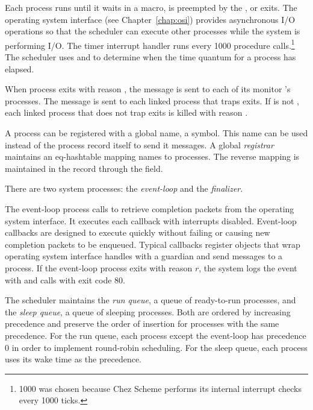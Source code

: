 Each process runs until it waits in a  macro, is
preempted by the , or exits.  The
operating system interface (see Chapter~\ref{chap:osi}) provides
asynchronous I/O operations so that the scheduler can execute other
processes while the system is performing I/O.  The timer interrupt
handler runs every 1000 procedure calls.\footnote{1000 was chosen
  because Chez Scheme performs its internal interrupt checks every
  1000 ticks.} The scheduler uses  and
 to determine when the time quantum for a
process has elapsed.

When process  exits with reason , the message
 is sent to each of its
monitor 's  processes.  The message
 is sent to each linked process that
traps exits. If  is not , each linked process
that does not trap exits is killed with reason .

A process can be registered with a global name, a symbol. This name
can be used instead of the process record itself to send it messages.
A global \emph{registrar} maintains an eq-hashtable
mapping names to processes. The reverse mapping is maintained in the
 record through the  field.

There are two system processes: the
\emph{event-loop} and the
\emph{finalizer}.

The event-loop process calls  to
retrieve completion packets from the operating system interface.  It
executes each callback with interrupts disabled.  Event-loop callbacks
are designed to execute quickly without failing or causing new
completion packets to be enqueued. Typical callbacks register objects
that wrap operating system interface handles with a guardian and send
messages to a process. If the event-loop process exits with reason
$r$, the system logs the event
 with
 and calls 
with exit code 80.

The scheduler maintains the \emph{run queue}, a queue
of ready-to-run processes, and the \emph{sleep queue}, a queue of sleeping processes. Both are ordered by
increasing precedence and preserve the order of insertion for
processes with the same precedence. For the run queue, each process
except the event-loop has precedence 0 in order to implement
round-robin scheduling. For the sleep queue, each process uses its
wake time as the precedence.

